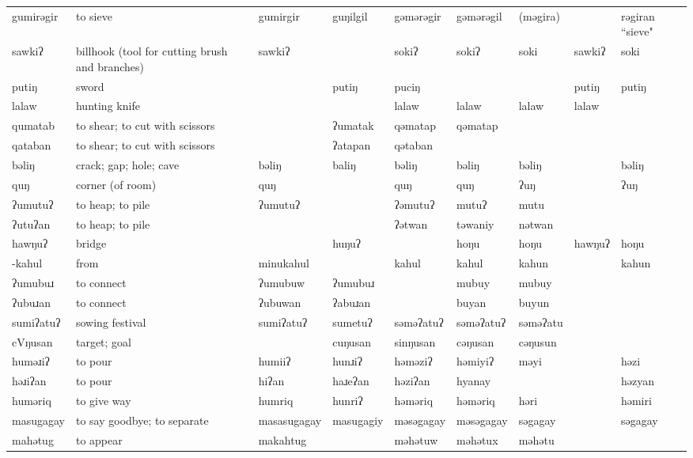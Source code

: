 \begin{landscape}
\begin{longtable}{*{9}{p{}}}
\text{*}gumirəgir & to sieve & gumirgir & guŋilgil & gəmərəgir & gəmərəgil & (məgira) &  & rəgiran ``sieve"\\
\text{*}sawkiʔ & billhook (tool for cutting brush and branches) & sawkiʔ &  & sokiʔ & sokiʔ & soki & sawkiʔ & soki\\
\text{*}putiŋ & sword &  & putiŋ & puciŋ &  &  & putiŋ & putiŋ\\
\text{*}lalaw & hunting knife &  &  & lalaw & lalaw & lalaw & lalaw & \\
\text{*}qumatab & to shear; to cut with scissors &  & ʔumatak & qəmatap & qəmatap &  &  & \\
\text{*}qataban & to shear; to cut with scissors &  & ʔatapan & qətaban &  &  &  & \\
\text{*}bəliŋ & crack; gap; hole; cave & bəliŋ & baliŋ & bəliŋ & bəliŋ & bəliŋ &  & bəliŋ\\
\text{*}quŋ & corner (of room) & quŋ &  & quŋ & quŋ & ʔuŋ &  & ʔuŋ\\
\text{*}ʔumutuʔ & to heap; to pile & ʔumutuʔ &  & ʔəmutuʔ & mutuʔ & mutu &  & \\
\text{*}ʔutuʔan & to heap; to pile &  &  & ʔətwan & təwaniy & nətwan &  & \\
\text{*}hawŋuʔ & bridge &  & huŋuʔ &  & hoŋu & hoŋu & hawŋuʔ & hoŋu\\
\text{*}-kahul & from & minukahul &  & kahul & kahul & kahun &  & kahun\\
\text{*}ʔumubuɹ & to connect & ʔumubuw & ʔumubuɹ &  & mubuy & mubuy &  & \\
\text{*}ʔubuɹan & to connect & ʔubuwan & ʔabuɹan &  & buyan & buyun &  & \\
\text{*}sumiʔatuʔ & sowing festival & sumiʔatuʔ & sumetuʔ & səməʔatuʔ & səməʔatuʔ & səməʔatu &  & \\
\text{*}cVŋusan & target; goal &  & cuŋusan & sinŋusan & cəŋusan & cəŋusun &  & \\
\text{*}huməɹiʔ & to pour & humiiʔ & hunɹiʔ & həməziʔ & həmiyiʔ & məyi &  & həzi\\
\text{*}həɹiʔan & to pour & hiʔan & haɹeʔan & həziʔan & hyanay &  &  & həzyan\\
\text{*}huməriq & to give way & humriq & hunriʔ & həməriq & həməriq & həri &  & həmiri\\
\text{*}masugagay & to say goodbye; to separate & masasugagay & masugagiy & məsəgagay & məsəgagay & səgagay &  & səgagay\\
\text{*}mahətug & to appear & makahtug &  & məhətuw & məhətux & məhətu &  & \\

\end{longtable}
\end{landscape}
